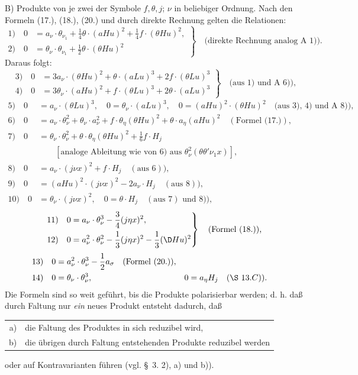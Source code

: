B) Produkte von je zwei der Symbole $f,\theta,j$; $\nu$ in beliebiger Ordnung. Nach den Formeln (17.), (18.), (20.) und durch direkte Rechnung gelten die Relationen:
\[
\left.
\begin{aligned}
1)\quad 0&=a_\nu\cdot\theta_{\nu_1}+\frac14\theta\cdot(aHu)^2+\frac14f\cdot(\theta Hu)^2,\\
2)\quad 0&=\theta_\nu\cdot\theta_{\nu_1}+\frac12\theta\cdot(\theta Hu)^2
\end{aligned}
\right\}\quad\text{(direkte Rechnung analog A 1)).}
\]
Daraus folgt:
\[
\left.
\begin{aligned}
3)\quad 0&=3a_\nu\cdot(\theta Hu)^2+\theta\cdot(aLu)^3+2f\cdot(\theta Lu)^3\\
4)\quad 0&=3\theta_\nu\cdot(aHu)^2+f\cdot(\theta Lu)^3+2\theta\cdot(aLu)^3
\end{aligned}
\right\}\quad\text{(aus 1) und A 6)),}
\]
\begin{align*}
5)\quad 0&=a_\nu\cdot(\theta Lu)^3,\quad 0=\theta_\nu\cdot(aLu)^3,\quad 0=(aHu)^2\cdot(\theta Hu)^2
\quad\text{(aus 3), 4) und A 8)),}\\
6)\quad 0&=a_\nu\cdot\theta_\nu^2+\theta_\nu\cdot a_\nu^2+f\cdot\theta_\eta(\theta Hu)^2+\theta\cdot a_\eta(aHu)^2\quad(\text{Formel (17.)}),\\
7)\quad 0&=\theta_\nu\cdot\theta_\nu^2+\theta\cdot\theta_\eta(\theta Hu)^2+\frac16f\cdot H_j\\
&\qquad [\text{analoge Ableitung wie von }6)\text{ aus }\theta_\nu^2(\theta\theta'\nu_1x)],\\
8)\quad 0&=a_\nu\cdot(j\nu x)^2+f\cdot H_j\quad(\text{aus }6)),\\
9)\quad 0&=(aHu)^2\cdot(j\nu x)^2-2a_\nu\cdot H_j\quad(\text{aus }8)),\\
10)\quad 0&=\theta_\nu\cdot(j\nu x)^2,\quad 0=\theta\cdot H_j\quad(\text{aus }7)\text{ und }8)),
\end{align*}
\[
\left.
\begin{aligned}
11)\quad 0&=a_\nu\cdot\theta_\nu^3-\frac34(j\eta x)^2,\\
12)\quad 0&=a_\nu^2\cdot\theta_\nu^2-\frac13(j\eta x)^2-\frac13(\D Hu)^2
\end{aligned}
\right\}\quad\text{(Formel (18.)),}
\]
\begin{align*}
13)\quad 0&=a_\nu^2\cdot\theta_\nu^3-\frac12a_\sigma\quad(\text{Formel (20.)}),\\
14)\quad 0&=\theta_\nu\cdot\theta_\nu^3,
&0&=a_\eta H_j\quad(\S\ 13. C)).
\end{align*}
Die Formeln sind so weit geführt, bis die Produkte polarisierbar werden; d. h. daß durch Faltung nur \emph{ein} neues Produkt entsteht dadurch, daß
\begin{center}
\begin{tabular}{rl}
a)&die Faltung des Produktes in sich reduzibel wird,\\
b)&die übrigen durch Faltung entstehenden Produkte reduzibel werden
\end{tabular}
\end{center}
oder auf Kontravarianten führen (vgl. \S\ 3. 2), a) und b)).

